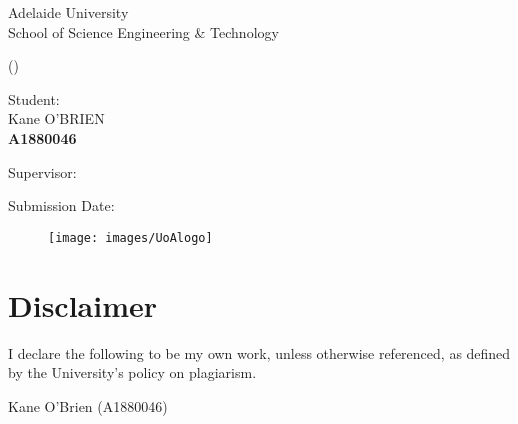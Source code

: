 \begin{titlepage}
\centering
{\Large Adelaide University\\ \vspace{1ex}School of Science Engineering \& Technology\\ \vspace{1ex}}

{\Large \textbf{\submissionType} (\courseCode)\\
\vfill

{\Huge \textbf{\submissionTitle}}

\par\vspace*{1\baselineskip}
{\large Student:\\}
{\Large Kane O'BRIEN\\ \textbf{A1880046} \\}
\vfill

{\large Supervisor:\\}
{\Large \supervisors}

\vspace{1em}

{\Large Submission Date: \dueDate \\}

\begin{figure}[b]\centering \hfill \texttt{[image: images/UoAlogo]}\end{figure}}
\end{titlepage}
\newpage



\section*{Disclaimer}
\begin{centering}I declare the following to be my own work, unless otherwise referenced, as defined by the University's policy on plagiarism.\\
\end{centering}

\begin{flushright}Kane O'Brien (A1880046)\\\vspace*{\baselineskip}\end{flushright}
\vfill
\clearpage
% 


\tableofcontents
\clearpage
\listoffigures
\listoftables
\clearpage
